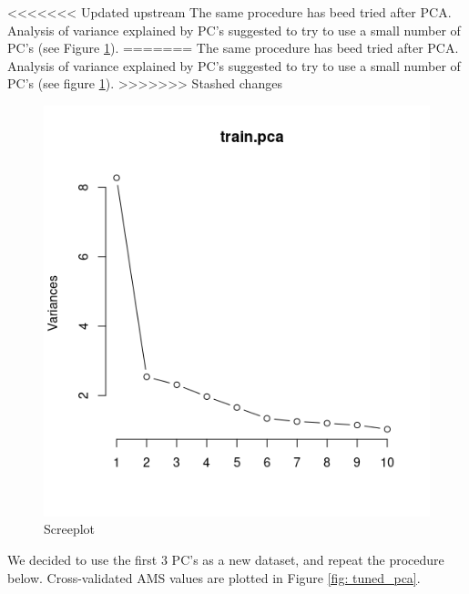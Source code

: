 \documentclass[]{article}
\begin{document}
<<<<<<< Updated upstream
The same procedure has beed tried after PCA. Analysis of variance explained by PC's suggested to try to use a small number of PC's (see Figure \ref{fig: screeplot}).
=======
The same procedure has beed tried after PCA. Analysis of variance explained by PC's suggested to try to use a small number of PC's (see figure \ref{fig: screeplot}).
>>>>>>> Stashed changes
\begin{figure}[H]
\centering
\includegraphics[scale=0.7]{../Pictures/trainpcascreeplot.png} 
\caption{Screeplot}
\label{fig: screeplot}
\end{figure}

We decided to use the first $3$ PC's as a new dataset, and repeat the procedure below. Cross-validated AMS values are plotted in Figure \ref{fig: tuned_pca}.
\end{document}
